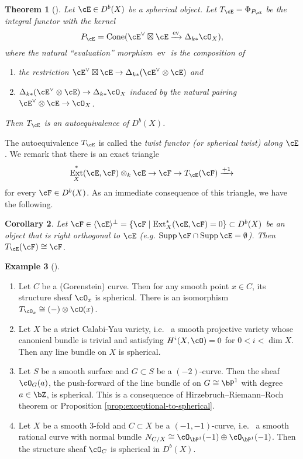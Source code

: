 \documentclass[12pt]{amsart}
\numberwithin{equation}{section}
\theoremstyle{plain}
\newtheorem{theorem}{Theorem}[section]
\newtheorem{corollary}[theorem]{Corollary}
\theoremstyle{definition}
\newtheorem{example}[theorem]{Example}
\DeclareMathOperator{\Cone}{\mathrm{Cone}}
\DeclareMathOperator{\ev}{\mathrm{ev}}
\DeclareMathOperator{\Supp}{\mathrm{Supp}}
\DeclareMathOperator{\Ext}{\mathrm{Ext}}
\begin{document}
\begin{theorem}[{\cite{MR1831820}}]
    Let $\cE \in D^b(X)$ be a spherical object.
    Let $T_{\cE} = \Phi_{P_{\cE}}$ be the integral functor with the kernel
    \begin{equation}
        P_{\cE} = \Cone(\cE^\vee \boxtimes \cE \xrightarrow{\ev} \Delta_{k*}\cO_X),
    \end{equation}
    where the natural ``evaluation'' morphism $\ev$ is the composition of
    \begin{enumerate}
        \item the restriction $\cE^\vee \boxtimes \cE \to \Delta_{k*}(\cE^\vee \otimes \cE)$ and
        \item $\Delta_{k*}(\cE^\vee \otimes \cE) \to \Delta_{k*}\cO_X$ induced by the natural pairing $\cE^\vee \otimes \cE \to \cO_X$.
    \end{enumerate}
    Then $T_{\cE}$ is an autoequivalence of $D^b(X)$.
\end{theorem}
The autoequivalence $T_{\cE}$ is called the \emph{twist functor (or spherical twist) along $\cE$}.
We remark that there is an exact triangle
\begin{equation}
    \Ext^*_X(\cE, \cF)\otimes_k \cE \to \cF \to T_{\cE}(\cF) \xrightarrow{+1}
\end{equation}
for every $\cF \in D^b(X)$.
As an immediate consequence of this triangle, we have the following.
\begin{corollary}\label{cor:orthogonal-to-spherical}
    Let $\cF \in \langle \cE \rangle^\perp = \{\cF \mid \Ext^*_X(\cE, \cF) = 0\} \subset D^b(X)$ be an object that is right orthogonal to $\cE$ (e.g. $\Supp \cF \cap \Supp \cE = \emptyset$).
    Then $T_{\cE}(\cF) \cong \cF$.
\end{corollary}
\begin{example}[{\cite{MR1831820}}]\label{ex:spherical-objects}
    \begin{enumerate}
        \item Let $C$ be a (Gorenstein) curve. Then for any smooth point $x \in C$, its structure sheaf $\cO_x$ is spherical. There is an isomorphism $T_{\cO_x} \cong (-) \otimes \cO(x)$.
        \item Let $X$ be a strict Calabi-Yau variety, i.e.~ a smooth projective variety whose canonical bundle is trivial and satisfying $H^i(X, \cO)=0$ for $0 < i < \dim X$. Then any line bundle on $X$ is spherical.
        \item Let $S$ be a smooth surface and $G \subset S$ be a $(-2)$-curve. Then the sheaf $\cO_G(a)$, the push-forward of the line bundle of on $G \cong \bP^1$ with degree $a \in \bZ$, is spherical. This is a consequence of Hirzebruch--Riemann--Roch theorem or Proposition \ref{prop:exceptional-to-spherical}.
        \item Let $X$ be a smooth $3$-fold and $C \subset X$ be a $(-1, -1)$-curve, i.e.~ a smooth rational curve with normal bundle $N_{C/X} \cong \cO_{\bP^1}(-1)\oplus\cO_{\bP^1}(-1)$. Then the structure sheaf $\cO_C$ is spherical in $D^b(X)$.
    \end{enumerate}
\end{example}
\end{document}
